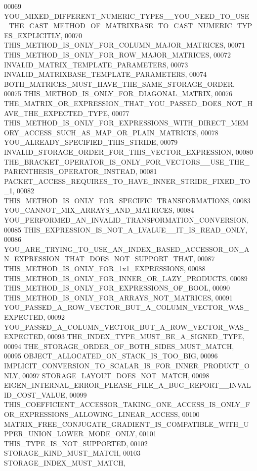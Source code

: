 \begin{DoxyCode}
00069         
      YOU\_MIXED\_DIFFERENT\_NUMERIC\_TYPES\_\_YOU\_NEED\_TO\_USE\_THE\_CAST\_METHOD\_OF\_MATRIXBASE\_TO\_CAST\_NUMERIC\_TYPES\_EXPLICITLY,
00070         THIS\_METHOD\_IS\_ONLY\_FOR\_COLUMN\_MAJOR\_MATRICES,
00071         THIS\_METHOD\_IS\_ONLY\_FOR\_ROW\_MAJOR\_MATRICES,
00072         INVALID\_MATRIX\_TEMPLATE\_PARAMETERS,
00073         INVALID\_MATRIXBASE\_TEMPLATE\_PARAMETERS,
00074         BOTH\_MATRICES\_MUST\_HAVE\_THE\_SAME\_STORAGE\_ORDER,
00075         THIS\_METHOD\_IS\_ONLY\_FOR\_DIAGONAL\_MATRIX,
00076         THE\_MATRIX\_OR\_EXPRESSION\_THAT\_YOU\_PASSED\_DOES\_NOT\_HAVE\_THE\_EXPECTED\_TYPE,
00077         THIS\_METHOD\_IS\_ONLY\_FOR\_EXPRESSIONS\_WITH\_DIRECT\_MEMORY\_ACCESS\_SUCH\_AS\_MAP\_OR\_PLAIN\_MATRICES,
00078         YOU\_ALREADY\_SPECIFIED\_THIS\_STRIDE,
00079         INVALID\_STORAGE\_ORDER\_FOR\_THIS\_VECTOR\_EXPRESSION,
00080         THE\_BRACKET\_OPERATOR\_IS\_ONLY\_FOR\_VECTORS\_\_USE\_THE\_PARENTHESIS\_OPERATOR\_INSTEAD,
00081         PACKET\_ACCESS\_REQUIRES\_TO\_HAVE\_INNER\_STRIDE\_FIXED\_TO\_1,
00082         THIS\_METHOD\_IS\_ONLY\_FOR\_SPECIFIC\_TRANSFORMATIONS,
00083         YOU\_CANNOT\_MIX\_ARRAYS\_AND\_MATRICES,
00084         YOU\_PERFORMED\_AN\_INVALID\_TRANSFORMATION\_CONVERSION,
00085         THIS\_EXPRESSION\_IS\_NOT\_A\_LVALUE\_\_IT\_IS\_READ\_ONLY,
00086         YOU\_ARE\_TRYING\_TO\_USE\_AN\_INDEX\_BASED\_ACCESSOR\_ON\_AN\_EXPRESSION\_THAT\_DOES\_NOT\_SUPPORT\_THAT,
00087         THIS\_METHOD\_IS\_ONLY\_FOR\_1x1\_EXPRESSIONS,
00088         THIS\_METHOD\_IS\_ONLY\_FOR\_INNER\_OR\_LAZY\_PRODUCTS,
00089         THIS\_METHOD\_IS\_ONLY\_FOR\_EXPRESSIONS\_OF\_BOOL,
00090         THIS\_METHOD\_IS\_ONLY\_FOR\_ARRAYS\_NOT\_MATRICES,
00091         YOU\_PASSED\_A\_ROW\_VECTOR\_BUT\_A\_COLUMN\_VECTOR\_WAS\_EXPECTED,
00092         YOU\_PASSED\_A\_COLUMN\_VECTOR\_BUT\_A\_ROW\_VECTOR\_WAS\_EXPECTED,
00093         THE\_INDEX\_TYPE\_MUST\_BE\_A\_SIGNED\_TYPE,
00094         THE\_STORAGE\_ORDER\_OF\_BOTH\_SIDES\_MUST\_MATCH,
00095         OBJECT\_ALLOCATED\_ON\_STACK\_IS\_TOO\_BIG,
00096         IMPLICIT\_CONVERSION\_TO\_SCALAR\_IS\_FOR\_INNER\_PRODUCT\_ONLY,
00097         STORAGE\_LAYOUT\_DOES\_NOT\_MATCH,
00098         EIGEN\_INTERNAL\_ERROR\_PLEASE\_FILE\_A\_BUG\_REPORT\_\_INVALID\_COST\_VALUE,
00099         THIS\_COEFFICIENT\_ACCESSOR\_TAKING\_ONE\_ACCESS\_IS\_ONLY\_FOR\_EXPRESSIONS\_ALLOWING\_LINEAR\_ACCESS,
00100         MATRIX\_FREE\_CONJUGATE\_GRADIENT\_IS\_COMPATIBLE\_WITH\_UPPER\_UNION\_LOWER\_MODE\_ONLY,
00101         THIS\_TYPE\_IS\_NOT\_SUPPORTED,
00102         STORAGE\_KIND\_MUST\_MATCH,
00103         STORAGE\_INDEX\_MUST\_MATCH,

\end{DoxyCode}
